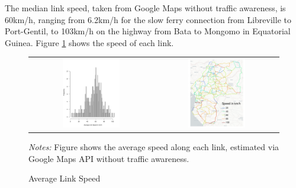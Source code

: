 \documentclass[a4paper]{article}
\begin{document}
The median link speed, taken from Google Maps without traffic awareness, is 60km/h, ranging from 6.2km/h for the slow ferry connection from Libreville to Port-Gentil, to 103km/h on the highway from Bata to Mongomo in Equatorial Guinea. Figure \ref{fig:ALS} shows the speed of each link. 

\begin{figure}[H]  \vspace{-1mm}
\centering
\caption{\label{fig:ALS} Average Link Speed}
\vspace{2mm}
\begin{tabular}{cc}
\includegraphics[width=0.48\textwidth, trim = {0 0.4cm 1.5cm 2.5cm}, clip]{"../figures/trans_CEMAC_network_average_link_speed_hist_google.pdf"} &
\includegraphics[width=0.48\textwidth]{"../figures/trans_CEMAC_network_average_link_speed_google.pdf"}  \\ %
\end{tabular}
\scriptsize 
\emph{Notes:} Figure shows the average speed along each link, estimated via Google Maps API without traffic awareness. 
\end{figure}
\end{document}

